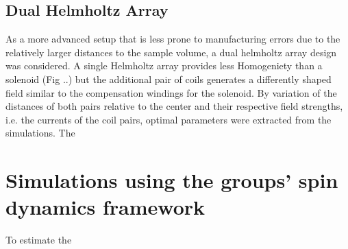 		\subsection{Dual Helmholtz Array}
			As a more advanced setup that is less prone to manufacturing errors due to the relatively larger distances to the sample volume, a dual helmholtz array design was considered. A single Helmholtz array provides less Homogeniety than a solenoid (Fig ..) but the additional pair of coils generates a differently shaped field similar to the compensation windings for the solenoid. By variation of the distances of both pairs relative to the center and their respective field strengths, i.e. the currents of the coil pairs, optimal parameters were extracted from the simulations. The 
	\section{Simulations using the groups' spin dynamics framework}
		To estimate the 

